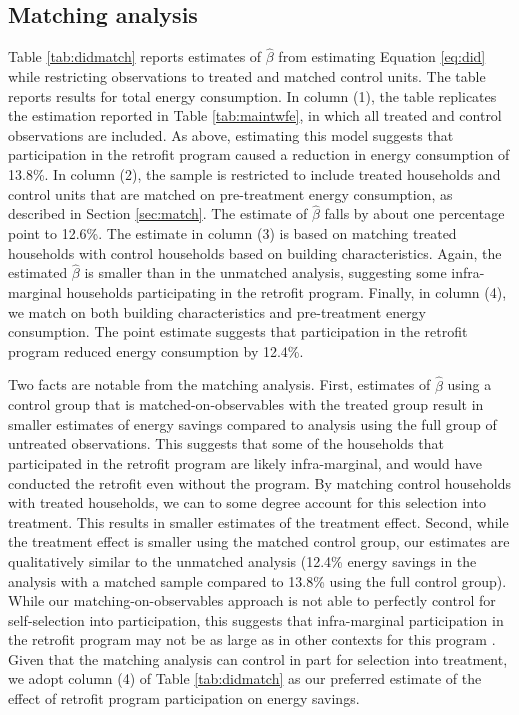 \documentclass{article}
\begin{document}


\subsection{Matching analysis}
Table \ref{tab:didmatch} reports estimates of $\hat{\beta}$ from estimating Equation \eqref{eq:did} while restricting observations to treated and matched control units. The table reports results for total energy consumption. In column (1), the table replicates the estimation reported in Table \ref{tab:maintwfe}, in which all treated and control observations are included. As above, estimating this model suggests that participation in the retrofit program caused a reduction in energy consumption of 13.8\%. In column (2), the sample is restricted to include treated households and control units that are matched on pre-treatment energy consumption, as described in Section \ref{sec:match}. The estimate of $\hat{\beta}$ falls by about one percentage point to 12.6\%. The estimate in column (3) is based on matching treated households with control households based on building characteristics. Again, the estimated $\hat{\beta}$ is smaller than in the unmatched analysis, suggesting some infra-marginal households participating in the retrofit program. Finally, in column (4), we match on both building characteristics and pre-treatment energy consumption. The point estimate suggests that participation in the retrofit program reduced energy consumption by 12.4\%. 

Two facts are notable from the matching analysis.  First, estimates of $\hat{\beta}$ using a control group that is matched-on-observables with the treated group result in smaller estimates of energy savings compared to analysis using the full group of untreated observations. This suggests that some of the households that participated in the retrofit program are likely infra-marginal, and would have conducted the retrofit even without the program. By matching control households with treated households, we can to some degree account for this selection into treatment. This results in smaller estimates of the treatment effect. Second, while the treatment effect is smaller using the matched control group, our estimates are qualitatively similar to the unmatched analysis (12.4\% energy savings in the analysis with a matched sample compared to 13.8\% using the full control group). While our matching-on-observables approach is not able to perfectly control for self-selection into participation, this suggests that infra-marginal participation in the retrofit program may not be as large as in other contexts for this program \citep{grosche2009willingness, rivers2016free, boomhower2014credible}. Given that the matching analysis can control in part for selection into treatment, we adopt column (4) of Table \ref{tab:didmatch} as our preferred estimate of the effect of retrofit program participation on energy savings.
\end{document}
